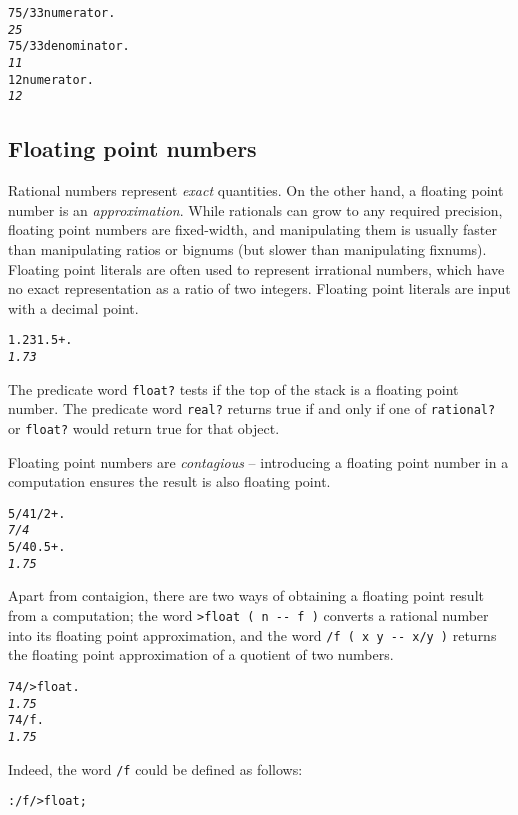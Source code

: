 \documentclass[english]{article}
\begin{document}
\begin{alltt}
75/33 numerator .
\emph{25}
75/33 denominator .
\emph{11}
12 numerator .
\emph{12}
\end{alltt}

\subsection{Floating point numbers}

Rational numbers represent \emph{exact} quantities. On the other hand, a floating point number is an \emph{approximation}. While rationals can grow to any required precision, floating point numbers are fixed-width, and manipulating them is usually faster than manipulating ratios or bignums (but slower than manipulating fixnums). Floating point literals are often used to represent irrational numbers, which have no exact representation as a ratio of two integers. Floating point literals are input with a decimal point.

\begin{alltt}
1.23 1.5 + .
\emph{1.73}
\end{alltt}

The predicate word \texttt{float?} tests if the top of the stack is a floating point number. The predicate word \texttt{real?} returns true if and only if one of \texttt{rational?} or \texttt{float?} would return true for that object.

Floating point numbers are \emph{contagious} -- introducing a floating point number in a computation ensures the result is also floating point.

\begin{alltt}
5/4 1/2 + .
\emph{7/4}
5/4 0.5 + .
\emph{1.75}
\end{alltt}

Apart from contaigion, there are two ways of obtaining a floating point result from a computation; the word \texttt{>float ( n -{}- f )} converts a rational number into its floating point approximation, and the word \texttt{/f ( x y -{}- x/y )} returns the floating point approximation of a quotient of two numbers.

\begin{alltt}
7 4 / >float .
\emph{1.75}
7 4 /f .
\emph{1.75}
\end{alltt}

Indeed, the word \texttt{/f} could be defined as follows:

\begin{alltt}
: /f / >float ;
\end{alltt}
\end{document}
